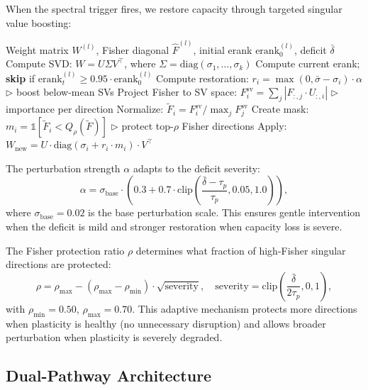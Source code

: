 \documentclass{article}
\newcommand{\erank}{\mathrm{erank}}
\begin{document}
When the spectral trigger fires, we restore capacity through targeted singular value boosting:

\begin{algorithm}[H]
\caption{Fisher-Guided Spectral Perturbation}
\label{alg:perturb}
\begin{algorithmic}[1]
\REQUIRE Weight matrix $W^{(l)}$, Fisher diagonal $\hat{F}^{(l)}$, initial erank $\erank_0^{(l)}$, deficit $\bar{\delta}$
\STATE Compute SVD: $W = U \Sigma V^\top$, where $\Sigma = \text{diag}(\sigma_1, \ldots, \sigma_k)$
\STATE Compute current erank; \textbf{skip} if $\erank_t^{(l)} \geq 0.95 \cdot \erank_0^{(l)}$
\STATE Compute restoration: $r_i = \max(0, \bar{\sigma} - \sigma_i) \cdot \alpha$ \hfill $\triangleright$ boost below-mean SVs
\STATE Project Fisher to SV space: $F_i^{\text{sv}} = \sum_j |F_{:,j} \cdot U_{:,i}|$ \hfill $\triangleright$ importance per direction
\STATE Normalize: $\tilde{F}_i = F_i^{\text{sv}} / \max_j F_j^{\text{sv}}$
\STATE Create mask: $m_i = \mathbb{1}[\tilde{F}_i < Q_\rho(\tilde{F})]$ \hfill $\triangleright$ protect top-$\rho$ Fisher directions
\STATE Apply: $W_{\text{new}} = U \cdot \text{diag}(\sigma_i + r_i \cdot m_i) \cdot V^\top$
\end{algorithmic}
\end{algorithm}

The perturbation strength $\alpha$ adapts to the deficit severity:
\begin{equation}
    \alpha = \sigma_{\text{base}} \cdot \left(0.3 + 0.7 \cdot \text{clip}\left(\frac{\bar{\delta} - \tau_p}{\tau_p}, 0.05, 1.0\right)\right),
\end{equation}
where $\sigma_{\text{base}} = 0.02$ is the base perturbation scale. This ensures gentle intervention when the deficit is mild and stronger restoration when capacity loss is severe.

The Fisher protection ratio $\rho$ determines what fraction of high-Fisher singular directions are protected:
\begin{equation}
    \rho = \rho_{\max} - (\rho_{\max} - \rho_{\min}) \cdot \sqrt{\text{severity}}, \quad \text{severity} = \text{clip}\left(\frac{\bar{\delta}}{2\tau_p}, 0, 1\right),
    \label{eq:adaptive_protect}
\end{equation}
with $\rho_{\min} = 0.50$, $\rho_{\max} = 0.70$. This adaptive mechanism protects more directions when plasticity is healthy (no unnecessary disruption) and allows broader perturbation when plasticity is severely degraded.


\subsection{Dual-Pathway Architecture}
\label{sec:dual}
\end{document}
